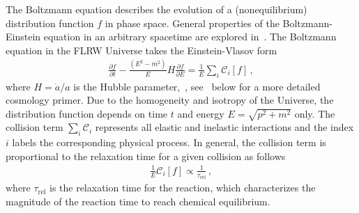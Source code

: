 The Boltzmann equation describes the evolution of {\color{black} a (nonequilibrium)} distribution function $f$ in phase space. General properties of the Boltzmann-Einstein equation in an arbitrary spacetime are explored in~. The Boltzmann equation in the FLRW Universe takes the Einstein-Vlasov form
\begin{align}\label{Hubble:Boltzmann}
\frac{\partial f}{\partial t}-\frac{\left(E^2-m^2\right)}{E}H\frac{\partial f}{\partial E}=\frac{1}{E}\sum_{i}\mathcal{C}_i[f]\,,
\end{align}
where $H=\dot{a}/a$ is the Hubble parameter,~, see~ below for a more detailed cosmology primer. Due to the homogeneity and isotropy of the Universe, the distribution function depends on time $t$ and energy $E=\sqrt{p^2+m^2}$ only. The collision term $\sum_i \mathcal{C}_i$ represents all elastic and inelastic interactions and the index $i$ labels the corresponding physical process. In general, the collision term is proportional to the relaxation time for a given collision as follows~\cite{Anderson:1974nyl}
\begin{align}
\frac{1}{E}\mathcal{C}_i[f]\propto\frac{1}{\tau_\mathrm{rel}}\,,
\end{align}
where $\tau_\mathrm{rel}$ is the relaxation time for the reaction, which characterizes the magnitude of the reaction time to reach chemical equilibrium. 

